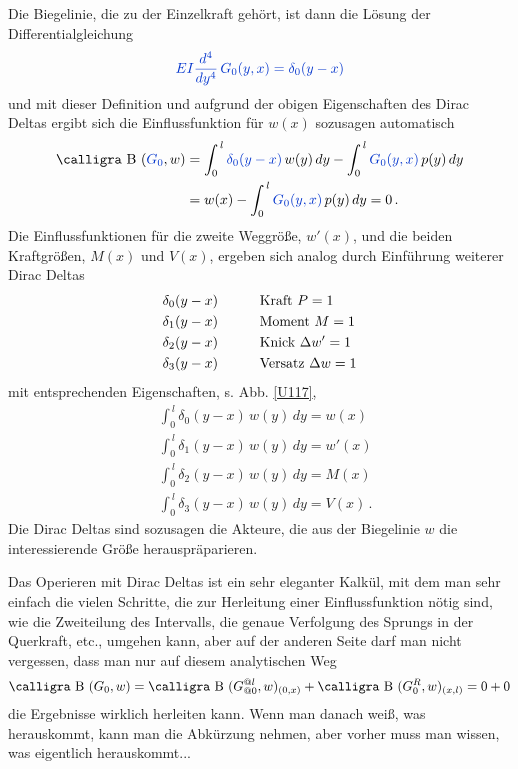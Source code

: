 Die Biegelinie, die zu der Einzelkraft geh\"{o}rt, ist dann die L\"{o}sung der Differentialgleichung
\begin{align}
\textcolor{chapterTitleBlue}{EI \frac{d^4}{dy^4}\,G_0(y,x) = \delta_0(y-x)}
\end{align}
und mit dieser Definition und aufgrund der obigen Eigenschaften des Dirac Deltas ergibt sich die Einflussfunktion f\"{u}r $w(x) $ sozusagen automatisch
\begin{align}
\text{\normalfont\calligra B\,\,}(\textcolor{chapterTitleBlue}{G_0},w) &= \int_0^{\,l} \textcolor{chapterTitleBlue}{\delta_0(y-x)}\,w(y)\,dy - \int_0^{\,l} \textcolor{chapterTitleBlue}{G_0(y,x)}\,p(y)\,dy \nn \\
&= w(x) - \int_0^{\,l} \textcolor{chapterTitleBlue}{G_0(y,x)}\,p(y)\,dy  = 0\,.
\end{align}
Die Einflussfunktionen f\"{u}r die zweite Weggr\"{o}{\ss}e, $w'(x) $, und die beiden Kraftgr\"{o}{\ss}en, $M(x) $ und $V(x) $, ergeben sich analog durch Einf\"{u}hrung weiterer Dirac Deltas
\begin{alignat}{2}
&\delta_0(y-x) \qquad &&\text{Kraft $P = 1$}\nonumber \\
&\delta_1(y-x) \qquad &&\text{Moment $M = 1$}\nonumber \\
&\delta_2(y-x) \qquad &&\text{Knick $\Delta w' = 1$}\nonumber\\
&\delta_3(y-x) \qquad &&\text{Versatz $\Delta w = 1$}\nonumber
\end{alignat}
mit entsprechenden Eigenschaften, s. Abb. \ref{U117},
\begin{subequations}
\begin{alignat}{2}
&\int_0^{\,l} \delta_0(y-x)\,w(y)\,dy = w(x) \\
&\int_0^{\,l} \delta_1(y-x)\,w(y)\,dy = w'(x) \\
&\int_0^{\,l} \delta_2(y-x)\,w(y)\,dy = M(x) \\
&\int_0^{\,l} \delta_3(y-x)\,w(y)\,dy = V(x)\,.
\end{alignat}
\end{subequations}
Die Dirac Deltas sind sozusagen die Akteure, die aus der Biegelinie $w$ die interessierende Gr\"{o}{\ss}e herauspr\"{a}parieren.

Das Operieren mit Dirac Deltas ist ein sehr eleganter Kalk\"{u}l, mit dem man sehr einfach die vielen Schritte, die zur Herleitung einer Einflussfunktion n\"{o}tig sind, wie die Zweiteilung des Intervalls, die genaue Verfolgung des Sprungs in der Querkraft, etc., umgehen kann, aber auf der anderen Seite darf man nicht vergessen, dass man nur auf diesem analytischen Weg
\begin{align}
\text{\normalfont\calligra B\,\,}(G_0,w) = \text{\normalfont\calligra B\,\,}(G_{@0}^{@l},w)_{(0,x)} + \text{\normalfont\calligra B\,\,}(G_0^R,w)_{(x,l)} = 0 + 0
\end{align}
die Ergebnisse wirklich herleiten kann. Wenn man danach wei{\ss}, was herauskommt, kann man die Abk\"{u}rzung nehmen, aber vorher muss man wissen, was eigentlich herauskommt...

